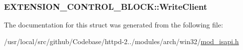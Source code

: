\subsubsection[{\texorpdfstring{Write\+Client}{WriteClient}}]{ E\+X\+T\+E\+N\+S\+I\+O\+N\+\_\+\+C\+O\+N\+T\+R\+O\+L\+\_\+\+B\+L\+O\+C\+K\+::\+Write\+Client}\hypertarget{structEXTENSION__CONTROL__BLOCK_a13dc4eb99391fed13f09cf99c6913318}{}\label{structEXTENSION__CONTROL__BLOCK_a13dc4eb99391fed13f09cf99c6913318}


The documentation for this struct was generated from the following file\+:\begin{DoxyCompactItemize}
\item 
/usr/local/src/github/\+Codebase/httpd-\/2../modules/arch/win32/\hyperlink{mod__isapi_8h}{mod\+\_\+isapi.\+h}\end{DoxyCompactItemize}
